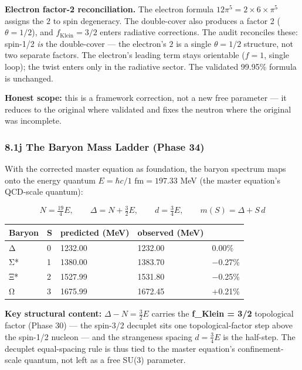 \documentclass[
]{article}
\begin{document}
\textbf{Electron factor-2 reconciliation.} The electron formula
\(12\pi^5 = 2\times6\times\pi^5\) assigns the \(2\) to spin degeneracy.
The double-cover also produces a factor 2 (\(\theta=1/2\)), and
\(f_{\text{Klein}} = 3/2\) enters radiative corrections. The audit
reconciles these: spin-1/2 \emph{is} the double-cover --- the electron's
\(2\) is a single \(\theta = 1/2\) structure, not two separate factors.
The electron's leading term stays orientable (\(f=1\), single loop); the
twist enters only in the radiative sector. The validated 99.95\% formula
is unchanged.

\textbf{Honest scope:} this is a framework correction, not a new free
parameter --- it reduces to the original where validated and fixes the
neutron where the original was incomplete.

\subsubsection{8.1j The Baryon Mass Ladder (Phase
34)}\label{j-the-baryon-mass-ladder-phase-34}

With the corrected master equation as foundation, the baryon spectrum
maps onto the energy quantum \(E = \hbar c/1\text{ fm} = 197.33\) MeV
(the master equation's QCD-scale quantum):

\[N = \tfrac{19}{4}E, \qquad \Delta = N + \tfrac{3}{2}E, \qquad d = \tfrac{3}{4}E, \qquad m(S) = \Delta + S\,d\]

\begin{longtable}[]{@{}lllll@{}}
\toprule\noalign{}
Baryon & S & predicted (MeV) & observed (MeV) & \\
\midrule\noalign{}
\endhead
\bottomrule\noalign{}
\endlastfoot
Δ & 0 & 1232.00 & 1232.00 & 0.00\% \\
Σ* & 1 & 1380.00 & 1383.70 & −0.27\% \\
Ξ* & 2 & 1527.99 & 1531.80 & −0.25\% \\
Ω & 3 & 1675.99 & 1672.45 & +0.21\% \\
\end{longtable}

\textbf{Key structural content:} \(\Delta - N = \tfrac{3}{2}E\) carries
the \textbf{f\_Klein = 3/2} topological factor (Phase 30) --- the
spin-3/2 decuplet sits one topological-factor step above the spin-1/2
nucleon --- and the strangeness spacing \(d = \tfrac{3}{4}E\) is the
half-step. The decuplet equal-spacing rule is thus tied to the master
equation's confinement-scale quantum, not left as a free SU(3)
parameter.
\end{document}
